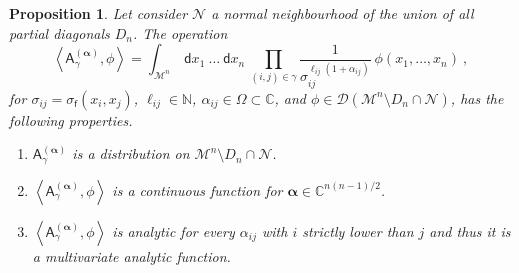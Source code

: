 \documentclass[11pt]{book}
\newcommand{\alphabd}{\boldsymbol{\alpha}}
\newcommand{\sm}[1]{\left\langle#1\right\rangle}
\newcommand{\Dcal}{\mathcal{D}}
\newcommand{\Mcal}{\mathcal{M}}
\newcommand{\Ncal}{\mathcal{N}}
\newcommand{\Cbb}{\mathbb{C}}
\newcommand{\Nbb}{\mathbb{N}}
\newcommand{\Asf}{\mathsf{A}}
\newcommand{\dsf}{\mathsf{d}}
\newcommand{\fsf}{\mathsf{f}}
\theoremstyle{break}
\newtheorem{proposition}{Proposition}[chapter]
\begin{document}
\begin{proposition}\label{prop:amplitude_sigma_prop_analyt}
Let consider $\Ncal$ a normal neighbourhood of the union of all partial diagonals $D_n$. The operation
%
\begin{equation}
\sm{ \Asf_\gamma^{(\alphabd)} , \phi } = \int_{\Mcal^n} \ \dsf x_1 \ \dots \ \dsf x_n \ \prod_{(i,j)\in\gamma} \frac{1}{\sigma_{ij}^{\ell_{ij}(1+ \alpha_{ij})}} \ \phi(x_1,\dots,x_n) \ , 
\label{eq:amplitude_sigma_prop_analyt}
\end{equation}
%
for $\sigma_{ij}=\sigma_\fsf(x_i,x_j)$, $\ell_{ij} \in \Nbb$, $\alpha_{ij}\in\Omega\subset\Cbb$, and $\phi\in \Dcal(\Mcal^n\setminus D_n\cap \Ncal)$, has the following properties.
%
\begin{enumerate}
%
\item\label{item:1_amplitude_sigma_prop_analyt} $\Asf_\gamma^{(\alphabd)}$ is a distribution on $\Mcal^n\setminus D_n\cap \Ncal$.
%
\item\label{item:2_amplitude_sigma_prop_analyt} $\sm{ \Asf_\gamma^{(\alphabd)} , \phi }$ is a continuous function for $\alphabd \in \Cbb^{n(n-1)/2}$.
%
\item\label{item:3_amplitude_sigma_prop_analyt} $\sm{ \Asf_\gamma^{(\alphabd)} , \phi }$ is analytic for every $\alpha_{ij}$ with $i$ strictly lower than $j$ and thus it is a multivariate analytic function.
%
\end{enumerate}
%
\end{proposition}
\end{document}
